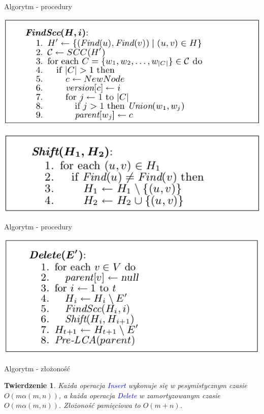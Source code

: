 \documentclass{beamer}
\newtheorem{tw}{Twierdzenie}
\newcommand{\emp}[1]{\textcolor{blue}{\textit{#1}}}
\begin{document}
\begin{frame}{Algorytm - procedury}
\begin{center}
\includegraphics[scale=0.4]{img/FindScc.png}
\end{center}

\begin{center}
\includegraphics[scale=0.4]{img/Shift.png}
\end{center}
\end{frame}

\begin{frame}{Algorytm - procedury}
\begin{center}
\includegraphics[scale=0.4]{img/Delete.png}
\end{center}
\end{frame}

\begin{frame}{Algorytm - złożoność}
\begin{tw}
Każda operacja \emp{Insert} wykonuje się w pesymistycznym czasie $O(m \alpha(m,n))$, a każda operacja \emp{Delete} w zamortyzowanym czasie $O(m \alpha(m,n))$. Złożoność pamięciowa to $O(m + n)$.
\end{tw}
\end{frame}
\end{document}
